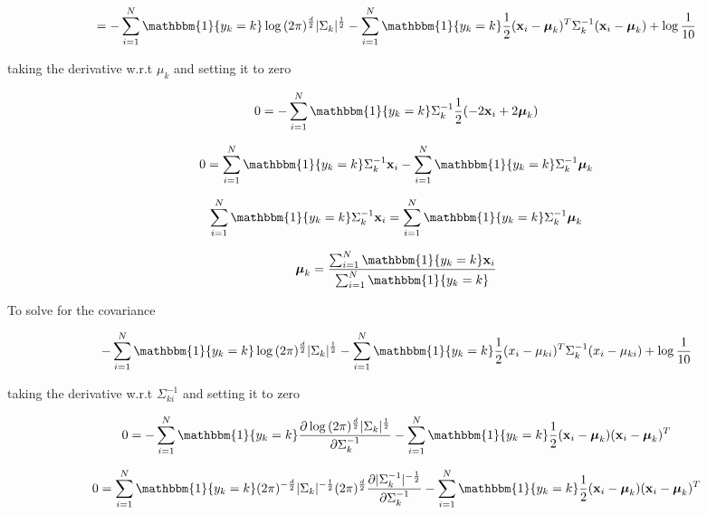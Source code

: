 \documentclass[12pt,letterpaper]{article} %
\newcommand{\bs}[1]{\bm{\mathrm{#1}}} %
\newcommand{\switch}[0]{\mathbbm{1}\{y_k=k\}}
\begin{document}
  \begin{equation*} 
  = -\sum^N_{i=1}\switch{}\log{(2\pi)^{\frac{d}{2}}|\Sigma_k|^{\frac{1}{2}}}-\sum^N_{i=1}\switch{}\frac{1}{2}(\bs{x}_i-\bs{\mu}_{k})^T\Sigma_k^{-1}(\bs{x}_i -\bs{\mu}_{k}) + \log{\frac{1}{10}}
 \end{equation*}

taking the derivative w.r.t $\mu_{k}$ and setting it to zero

\begin{equation*} 
 0 = -\sum^N_{i=1}\switch\Sigma_k^{-1}\frac{1}{2}(-2\bs{x}_i + 2\bs{\mu}_{k})
\end{equation*}

\begin{equation*} 
 0 = \sum^N_{i=1}\switch\Sigma_k^{-1}\bs{x}_i - \sum^N_{i=1}\switch\Sigma_k^{-1} \bs{\mu}_{k}
\end{equation*}

\begin{equation*} 
 \sum^N_{i=1}\switch\Sigma_k^{-1}\bs{x}_i = \sum^N_{i=1}\switch\Sigma_k^{-1} \bs{\mu}_{k}
\end{equation*}

\begin{equation*} 
 \bs{\mu}_{k} =\frac{\sum^N_{i=1}\switch{}\bs{x}_i}{\sum^N_{i=1}\switch}
\end{equation*}

To solve for the covariance

\begin{equation*} 
 -\sum^N_{i=1}\switch{}\log{(2\pi)^{\frac{d}{2}}|\Sigma_k|^{\frac{1}{2}}}-\sum^N_{i=1}\switch{}\frac{1}{2}(x_i-\mu_{ki})^T\Sigma_k^{-1}(x_i -\mu_{ki}) + \log{\frac{1}{10}}
 \end{equation*}
 
 taking the derivative w.r.t $\Sigma^{-1}_{ki}$ and setting it to zero
 
 \begin{equation*} 
 0=-\sum^N_{i=1}\switch{}\frac{\partial\log{(2\pi)^{\frac{d}{2}}|\Sigma_k|^{\frac{1}{2}}}}{\partial\Sigma^{-1}_{k}}-\sum^N_{i=1}\switch{}\frac{1}{2}(\bs{x}_i-\bs{\mu}_k)(\bs{x}_i -\bs{\mu}_k)^T 
 \end{equation*}
 
 \begin{equation*} 
 0= \sum^N_{i=1}\switch(2\pi)^{-\frac{d}{2}}|\Sigma_k|^{-\frac{1}{2}}(2\pi)^{\frac{d}{2}}\frac{\partial|\Sigma_{k}^{-1}|^{-\frac{1}{2}}}{\partial\Sigma^{-1}_{k}} - \sum^N_{i=1}\switch{}\frac{1}{2}(\bs{x}_i-\bs{\mu}_k)(\bs{x}_i -\bs{\mu}_k)^T 
 \end{equation*}
 
\end{document}
